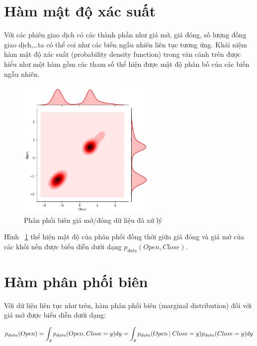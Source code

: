 \section{Hàm mật độ xác suất}
Với các phiên giao dịch có các thành phần như giá mở, giá đóng, số lượng đồng giao dịch,\dots ta có thể coi như các biến ngẫu nhiên liên tục tương ứng. Khái niệm hàm mật độ xác suất (probability density function) trong văn cảnh trên được hiểu như một hàm gồm các tham số thể hiện được mật độ phân bố của các biến ngẫu nhiên.
\begin{figure}[hbt!]
	\center	\includegraphics[width=0.6\textwidth]{figures/probability/z_score_marginal_distribute_diff.png}
	\caption{Phân phối biên giá mở/đóng dữ liệu đã xử lý}
	\label{fig:z_score_marginal_distribution_diff}
\end{figure}
\FloatBarrier
Hình ~\ref{fig:z_score_marginal_distribution_diff} thể hiện mật độ của phân phối đồng thời giữa giá đóng và giá mở của các khối nến được biểu diễn dưới dạng $p_{data}(Open, Close)$.
\section{Hàm phân phối biên}
Với dữ liệu liên tục như trên, hàm phân phối biên (marginal distribution) đối với giá mở được biểu diễn dưới dạng:

\begin{gather}
\label{mat}
p_{data}(Open) = \int_y p_{data}(Open, Close=y) dy = \int_y p_{data}(Open \:\lvert\: Close=y)p_{data}(Close=y)dy 
\end{gather}

 
 
 


